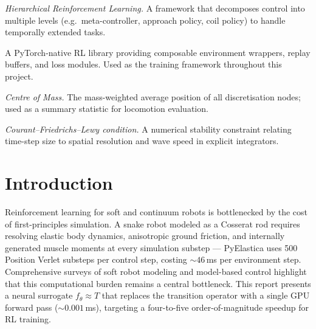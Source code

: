 \documentclass[11pt]{article}
\begin{document}
\begin{description}[style=nextline, leftmargin=3.2cm, labelwidth=3cm, font=\normalfont\bfseries]
  \item[HRL]
    \emph{Hierarchical Reinforcement Learning.} A framework that decomposes control into multiple levels (e.g.\ meta-controller, approach policy, coil policy) to handle temporally extended tasks.

  \item[TorchRL]
    A PyTorch-native RL library providing composable environment wrappers, replay buffers, and loss modules. Used as the training framework throughout this project.

  \item[CoM]
    \emph{Centre of Mass.} The mass-weighted average position of all discretisation nodes; used as a summary statistic for locomotion evaluation.

  \item[CFL condition]
    \emph{Courant--Friedrichs--Lewy condition.} A numerical stability constraint relating time-step size to spatial resolution and wave speed in explicit integrators.

\end{description}

\newpage

\section{Introduction}
\label{sec:intro}

Reinforcement learning for soft and continuum robots is bottlenecked by the cost of first-principles simulation.
A snake robot modeled as a Cosserat rod requires resolving elastic body dynamics, anisotropic ground friction, and internally generated muscle moments at every simulation substep --- PyElastica \citep{Naughton2021} uses 500 Position Verlet substeps per control step, costing ${\sim}46$\,ms per environment step.
Comprehensive surveys of soft robot modeling \citep{Armanini2022} and model-based control \citep{DellaSantina2023} highlight that this computational burden remains a central bottleneck.
This report presents a neural surrogate $f_\theta \approx T$ that replaces the transition operator with a single GPU forward pass (${\sim}0.001$\,ms), targeting a four-to-five order-of-magnitude speedup for RL training.
\end{document}
